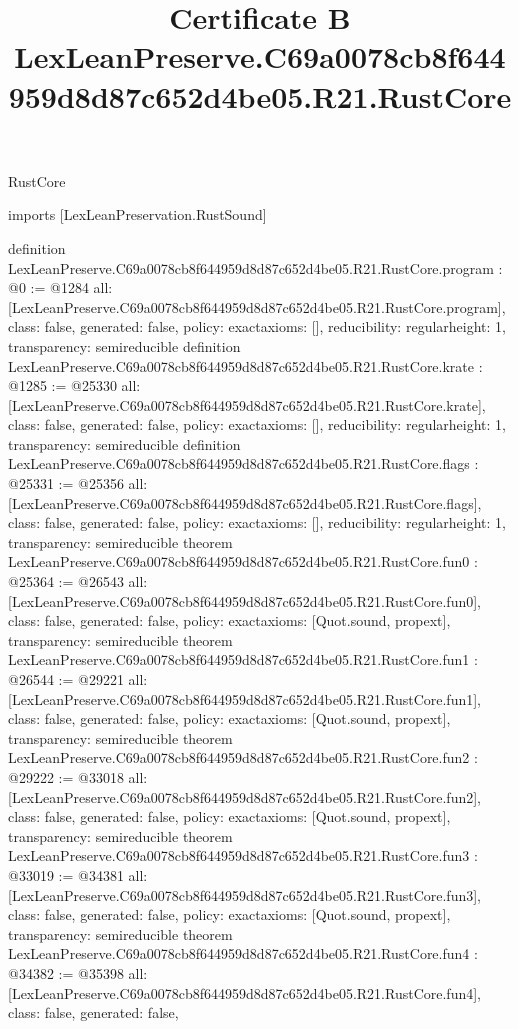 \begin{lexlean}{RustCore}
\title{Certificate B LexLeanPreserve.C69a0078cb8f644959d8d87c652d4be05.R21.RustCore}
\begin{coremodule}
imports [LexLeanPreservation.RustSound]

definition LexLeanPreserve.C69a0078cb8f644959d8d87c652d4be05.R21.RustCore.program : @0 := @1284 {
  all: [LexLeanPreserve.C69a0078cb8f644959d8d87c652d4be05.R21.RustCore.program],
  class: false,
  generated: false,
  policy: exact{axioms: []},
  reducibility: regular{height: 1},
  transparency: semireducible
}
definition LexLeanPreserve.C69a0078cb8f644959d8d87c652d4be05.R21.RustCore.krate : @1285 := @25330 {
  all: [LexLeanPreserve.C69a0078cb8f644959d8d87c652d4be05.R21.RustCore.krate],
  class: false,
  generated: false,
  policy: exact{axioms: []},
  reducibility: regular{height: 1},
  transparency: semireducible
}
definition LexLeanPreserve.C69a0078cb8f644959d8d87c652d4be05.R21.RustCore.flags : @25331 := @25356 {
  all: [LexLeanPreserve.C69a0078cb8f644959d8d87c652d4be05.R21.RustCore.flags],
  class: false,
  generated: false,
  policy: exact{axioms: []},
  reducibility: regular{height: 1},
  transparency: semireducible
}
theorem LexLeanPreserve.C69a0078cb8f644959d8d87c652d4be05.R21.RustCore.fun0 : @25364 := @26543 {
  all: [LexLeanPreserve.C69a0078cb8f644959d8d87c652d4be05.R21.RustCore.fun0],
  class: false,
  generated: false,
  policy: exact{axioms: [Quot.sound, propext]},
  transparency: semireducible
}
theorem LexLeanPreserve.C69a0078cb8f644959d8d87c652d4be05.R21.RustCore.fun1 : @26544 := @29221 {
  all: [LexLeanPreserve.C69a0078cb8f644959d8d87c652d4be05.R21.RustCore.fun1],
  class: false,
  generated: false,
  policy: exact{axioms: [Quot.sound, propext]},
  transparency: semireducible
}
theorem LexLeanPreserve.C69a0078cb8f644959d8d87c652d4be05.R21.RustCore.fun2 : @29222 := @33018 {
  all: [LexLeanPreserve.C69a0078cb8f644959d8d87c652d4be05.R21.RustCore.fun2],
  class: false,
  generated: false,
  policy: exact{axioms: [Quot.sound, propext]},
  transparency: semireducible
}
theorem LexLeanPreserve.C69a0078cb8f644959d8d87c652d4be05.R21.RustCore.fun3 : @33019 := @34381 {
  all: [LexLeanPreserve.C69a0078cb8f644959d8d87c652d4be05.R21.RustCore.fun3],
  class: false,
  generated: false,
  policy: exact{axioms: [Quot.sound, propext]},
  transparency: semireducible
}
theorem LexLeanPreserve.C69a0078cb8f644959d8d87c652d4be05.R21.RustCore.fun4 : @34382 := @35398 {
  all: [LexLeanPreserve.C69a0078cb8f644959d8d87c652d4be05.R21.RustCore.fun4],
  class: false,
  generated: false,
}
\end{coremodule}
\end{lexlean}
